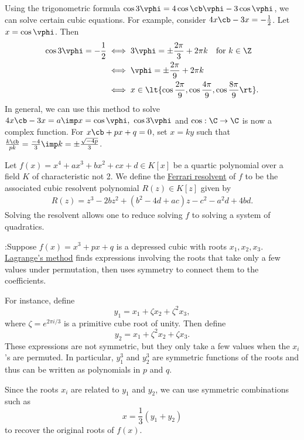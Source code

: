 \documentclass[a4paper]{article}
\begin{document}
\quad
Using the trigonometric formula \( \cos 3\vphi = 4\cos\cb \vphi-3\cos\vphi \), we can solve certain cubic equations.
For example, consider \( 4x\cb-3x=-\frac{1}{2} \).
Let \( x=\cos \vphi \).
Then \begin{align*}
  \cos 3\vphi = -\frac{1}{2} &\iff 3\vphi = \pm \frac{2\pi}{3}+2\pi k \quad \text{for } k\in \Z \\
  &\iff \vphi = \pm\frac{2\pi}{9}+2\pi k \\
  &\iff x \in \lt\{ \cos\frac{2\pi}{9},\cos\frac{4\pi}{9},\cos\frac{8\pi}{9} \rt\}.
\end{align*}
In general, we can use this method to solve \( 4x\cb-3x=a \imp x=\cos\vphi,\ \cos 3\vphi \) and \( \cos:\C\to\C \) is now a complex function.
For \( x\cb+px+q = 0 \), set \( x=ky \) such that \( \frac{k\cb}{pk} = \frac{-4}{3} \imp k = \pm\frac{\sqrt{-4p}}{3} \).

\begin{tdefinition}
  Let \( f(x) = x^4 + a x^3 + b x^2 + c x + d \in K[x] \) be a quartic polynomial over a field \( K \) of characteristic not 2.
  We define the \ul{Ferrari resolvent} of \( f \) to be the associated cubic resolvent polynomial \( R(z) \in K[z] \) given by
  \begin{align*}
    R(z) = z^3 - 2b z^2 + (b^2 - 4d + a c) z - c^2 - a^2 d + 4b d.
  \end{align*}
  Solving the resolvent allows one to reduce solving \( f \) to solving a system of quadratics.
\end{tdefinition}

:\quad Suppose \( f(x) = x^3 + px + q \) is a depressed cubic with roots \( x_1, x_2, x_3 \).
    \ul{Lagrange's method} finds expressions involving the roots that take only a few values under permutation, then uses symmetry to connect them to the coefficients.

    For instance, define
    \[
      y_1 = x_1 + \zeta x_2 + \zeta^2 x_3,
    \]
    where \( \zeta = e^{2\pi i/3} \) is a primitive cube root of unity. Then define
    \[
      y_2 = x_1 + \zeta^2 x_2 + \zeta x_3.
    \]
    These expressions are not symmetric, but they only take a few values when the \( x_i \)'s are permuted. In particular, \( y_1^3 \) and \( y_2^3 \) are symmetric functions of the roots and thus can be written as polynomials in \( p \) and \( q \).

    Since the roots \( x_i \) are related to \( y_1 \) and \( y_2 \), we can use symmetric combinations such as
    \[
      x = \frac{1}{3}(y_1 + y_2)
    \]
    to recover the original roots of \( f(x) \).
\end{document}
